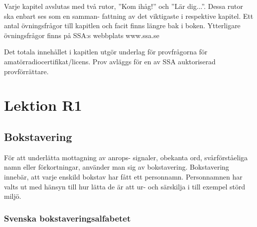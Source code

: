 
Varje kapitel avslutas med två rutor, ”Kom ihåg!” och
”Lär dig...”. Dessa rutor ska enbart ses som en samman-
fattning av det viktigaste i respektive kapitel. Ett antal
övningsfrågor till kapitlen och facit finns längre
bak i boken. Ytterligare övningsfrågor finns på SSA:s
webbplats www.ssa.se

Det totala innehållet i kapitlen utgör underlag för
provfrågorna för amatörradiocertifikat/licens. Prov
avläggs för en av SSA auktoriserad provförrättare.

\chapter{Lektion R1}

\section{Bokstavering}

För att underlätta mottagning av anrops-
signaler, obekanta ord, svårförståeliga namn
eller förkortningar, använder man sig av
bokstavering. Bokstavering innebär, att varje
enskild bokstav har fått ett personnamn.
Personnamnen har valts ut med hänsyn till
hur lätta de är att ur- och särskilja i till exempel
störd miljö.

\subsection{Svenska bokstaveringsalfabetet}

